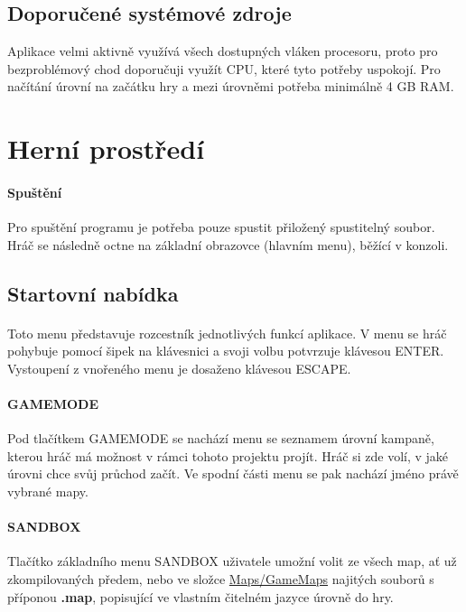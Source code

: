 \documentclass[a4paper, 12pt]{article}
\begin{document}
\subsection{Doporučené systémové zdroje}
Aplikace velmi aktivně využívá všech dostupných vláken procesoru, proto pro
bezproblémový chod doporučuji využít CPU, které tyto potřeby uspokojí. Pro
načítání úrovní na začátku hry a mezi úrovněmi potřeba minimálně 4 GB RAM.

\section{Herní prostředí}
\paragraph{Spuštění}
Pro spuštění programu je potřeba pouze spustit přiložený spustitelný soubor.
Hráč se následně octne na základní obrazovce (hlavním menu), běžící v konzoli. 

\subsection{Startovní nabídka}
\paragraph{}
Toto menu představuje rozcestník jednotlivých funkcí aplikace. V menu se hráč
pohybuje pomocí šipek na klávesnici a svoji volbu potvrzuje klávesou ENTER.
Vystoupení z vnořeného menu je dosaženo klávesou ESCAPE.

\paragraph{GAMEMODE}
Pod tlačítkem GAMEMODE se nachází menu se seznamem úrovní kampaně, kterou hráč
má možnost v rámci tohoto projektu projít. Hráč si zde volí, v jaké úrovni chce
svůj průchod začít. Ve spodní části menu se pak nachází jméno právě vybrané
mapy.

\paragraph{SANDBOX}
Tlačítko základního menu SANDBOX uživatele umožní volit ze všech map, ať už
zkompilovaných předem, nebo ve složce \url{Maps/GameMaps} najitých souborů s
příponou \textbf{.map}, popisující ve vlastním čitelném jazyce úrovně do hry.

\end{document}
